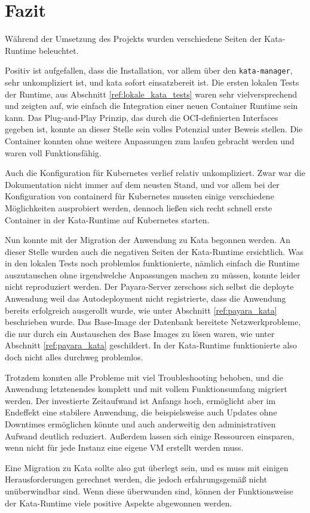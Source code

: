 \chapter{Fazit}

Während der Umsetzung des Projekts wurden verschiedene Seiten der Kata-Runtime beleuchtet.

Positiv ist aufgefallen, dass die Installation, vor allem über den \texttt{kata-manager}, sehr unkompliziert ist, und kata sofort einsatzbereit ist.
Die ersten lokalen Tests der Runtime, aus Abschnitt \ref{ref:lokale_kata_tests} waren sehr vielversprechend und zeigten auf, wie einfach die Integration einer neuen Container Runtime sein kann.
Das Plug-and-Play Prinzip, das durch die \ac{OCI}-definierten Interfaces gegeben ist, konnte an dieser Stelle sein volles Potenzial unter Beweis stellen.
Die Container konnten ohne weitere Anpassungen zum laufen gebracht werden und waren voll Funktionsfähig.

Auch die Konfiguration für Kubernetes verlief relativ unkompliziert. 
Zwar war die Dokumentation nicht immer auf dem neusten Stand, und vor allem bei der Konfiguration von containerd für Kubernetes mussten einige verschiedene Möglichkeiten ausprobiert werden, dennoch ließen sich recht schnell erste Container in der Kata-Runtime auf Kubernetes starten.

Nun konnte mit der Migration der Anwendung zu Kata begonnen werden.
An dieser Stelle wurden auch die negativen Seiten der Kata-Runtime ersichtlich.
Was in den lokalen Tests noch problemlos funktionierte, nämlich einfach die Runtime auszutauschen ohne irgendwelche Anpassungen machen zu müssen, konnte leider nicht reproduziert werden.
Der Payara-Server zerschoss sich selbst die deployte Anwendung weil das Autodeployment nicht registrierte, dass die Anwendung bereits erfolgreich ausgerollt wurde, wie unter Abschnitt \ref{ref:payara_kata} beschrieben wurde.
Das Base-Image der Datenbank bereitete Netzwerkprobleme, die nur durch ein Austauschen des Base Images zu lösen waren, wie unter Abschnitt \ref{ref:payara_kata} geschildert.
In der Kata-Runtime funktionierte also doch nicht alles durchweg problemlos.

Trotzdem konnten alle Probleme mit viel Troubleshooting behoben, und die Anwendung letztenendes komplett und mit vollem Funktionsumfang migriert werden.
Der investierte Zeitaufwand ist Anfangs hoch, ermöglicht aber im Endeffekt eine stabilere Anwendung, die beispielsweise auch Updates ohne Downtimes ermöglichen könnte und auch anderweitig den administrativen Aufwand deutlich reduziert.
Außerdem lassen sich einige Ressourcen einsparen, wenn nicht für jede Instanz eine eigene \ac{VM} erstellt werden muss.

Eine Migration zu Kata sollte also gut überlegt sein, und es muss mit einigen Herausforderungen gerechnet werden, die jedoch erfahrungsgemäß nicht unüberwindbar sind.
Wenn diese überwunden sind, können der Funktionsweise der Kata-Runtime viele positive Aspekte abgewonnen werden.